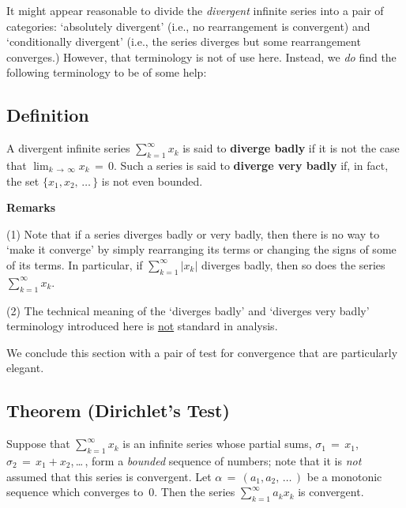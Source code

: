 \V
\V

        It might appear reasonable to divide the {\em divergent} infinite series into a pair of categories:
    `absolutely divergent' (i.e., no rearrangement is convergent) and `conditionally divergent' (i.e., the series diverges but some rearrangement converges.)
    However, that terminology is not of use here.
    Instead, we {\em do} find the following terminology to be of some help:

\V

        \subsection{\small{{\bf Definition}}}
        \label{DefG40.80}

\V

        A divergent infinite series $\sum_{k=1}^{{\infty}} x_{k}$ is said to {\bf diverge badly} if it is not the case that $\lim_{k \,{\rightarrow}\, {\infty}} x_{k} \,=\, 0$.
    Such a series is said to {\bf diverge very badly} if, in fact, the set $\{x_{1},x_{2},\,{\ldots}\,\}$ is not even bounded.

\V

        {\bf Remarks}

\V

        (1) Note that if a series diverges badly or very badly, then there is no way to `make it converge' by simply rearranging its terms or changing the signs of some of its terms.
    In particular, if $\sum_{k=1}^{{\infty}} |x_{k}|$ diverges badly, then so does the series $\sum_{k=1}^{{\infty}} x_{k}$.

\V

        (2) The technical meaning of the `diverges badly' and `diverges very badly' terminology introduced here is \underline{not} standard in analysis.

\V
\V

        We conclude this section with a pair of test for convergence that are particularly elegant.

\V

        \subsection{\small{{\bf Theorem}} (Dirichlet's Test)}
        \label{ThmG40.90}

\V

        Suppose that $\sum_{k=1}^{{\infty}} x_{k}$ is an infinite series whose partial sums,
    ${\sigma}_{1} \,=\, x_{1}$, ${\sigma}_{2} \,=\, x_{1} + x_{2}$,\,{\ldots}\,, form a {\em bounded} sequence of numbers;
    note that it is {\em not} assumed that this series is convergent.
    Let ${\alpha} \,=\, (a_{1},a_{2},\,{\ldots}\,)$ be a monotonic sequence  which converges to~$0$.
    Then the series $\sum_{k=1}^{{\infty}} a_{k}x_{k}$ is convergent.

